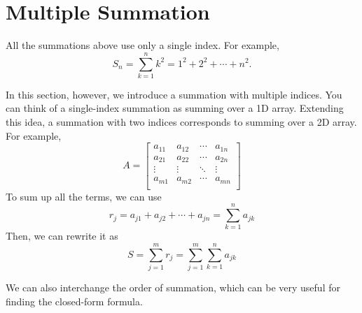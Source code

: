 \section{Multiple Summation}
All the summations above use only a single index. For example, 
\[
	S_n = \sum_{k = 1}^n k^2 = 1^2 + 2^2 + \cdots + n^2.
\]

In this section, however, we introduce a summation with multiple indices. You can think of a single-index summation as summing over a 1D array. Extending this idea, a summation with two indices corresponds to summing over a 2D array. For example,
\[
	A = \begin{bmatrix}
		a_{11} & a_{12} & \cdots & a_{1n}  \\
		a_{21} & a_{22} & \cdots & a_{2n}  \\
		\vdots & \vdots & \ddots & \vdots  \\
		a_{m1} & a_{m2} & \cdots & a_{mn}  \\
	\end{bmatrix}
\]
To sum up all the terms, we can use
\[
	r_j = a_{j1} + a_{j2} + \cdots + a_{jn} = \sum_{k = 1}^n a_{jk} 
\]
Then, we can rewrite it as
\[
	S = \sum_{j = 1}^m r_j = \sum_{j = 1}^m\sum_{k = 1}^n a_{jk}
\]

We can also interchange the order of summation, which can be very useful for finding the closed-form formula.